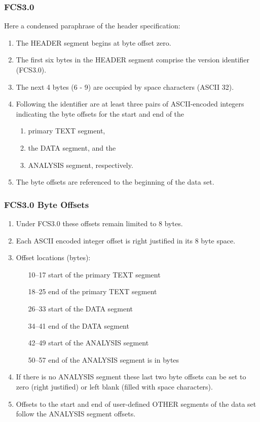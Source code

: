 \documentclass{beamer}
\begin{document}
\begin{frame}[fragile]
  \frametitle{FCS3.0}
  Here a condensed paraphrase of the header specification:
  \begin{enumerate}
  \item The HEADER segment begins at byte offset zero. 
  \item The first six bytes in the HEADER segment comprise the version identifier (FCS3.0).
  \item The next 4 bytes (6 - 9) are occupied by space characters (ASCII 32). 
  \item Following the identifier are at least three pairs of ASCII-encoded integers indicating the byte offsets for the start and end of the
    \begin{enumerate}
    \item primary TEXT segment, 
    \item the DATA segment, and the 
    \item ANALYSIS segment, respectively.
    \end{enumerate}
  \item The byte offsets are referenced to the beginning of the data set.
  \end{enumerate}
\end{frame}
\begin{frame}
  \frametitle{FCS3.0 Byte Offsets}
  \begin{enumerate}
  \item Under FCS3.0 these offsets remain limited to 8 bytes. 
  \item Each ASCII encoded integer offset is right justified in its 8 byte space. 
  \item Offset locations (bytes):
    \begin{enumerate}
    \item [10--17] start of the primary TEXT segment
    \item [18--25] end of the primary TEXT segment
    \item [26--33] start of the DATA segment
    \item [34--41] end of the DATA segment
    \item [42--49] start of the ANALYSIS segment
    \item [50--57] end of the ANALYSIS segment is in bytes
    \end{enumerate}
  \item If there is no ANALYSIS segment these last two byte offsets
    can be set to zero (right justified) or left blank (filled with
    space characters).
  \item Offsets to the start and end of user-defined OTHER segments of
    the data set follow the ANALYSIS segment offsets.
  \end{enumerate}
\end{frame}
\end{document}

